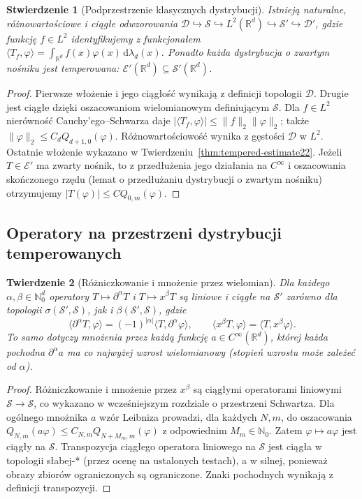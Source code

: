 \documentclass[11pt,a4paper]{article}
\numberwithin{equation}{section}
\theoremstyle{plain}
\newtheorem{twierdzenie}{Twierdzenie}[section]
\newtheorem{stwierdzenie}[twierdzenie]{Stwierdzenie}
\theoremstyle{definition}
\theoremstyle{remark}
\newcommand{\R}{\mathbb R}
\newcommand{\N}{\mathbb N}
\begin{document}
\begin{stwierdzenie}[Podprzestrzenie klasycznych dystrybucji]
\label{prop:schwartz-embeddings22}
Istnieją naturalne, różnowartościowe i ciągłe odwzorowania
$\mathcal D\hookrightarrow\mathcal S\hookrightarrow
L^2(\R^d)\hookrightarrow\mathcal S'\hookrightarrow\mathcal D'$,
gdzie funkcję $f\in L^2$ identyfikujemy z funkcjonałem
$\langle T_f,\varphi\rangle=\int_{\R^d}f(x)\varphi(x)
\,\mathrm d\lambda_d(x)$.
Ponadto każda dystrybucja o zwartym nośniku jest temperowana:
$\mathcal E'(\R^d)\subseteq\mathcal S'(\R^d)$.
\end{stwierdzenie}
\begin{proof}
Pierwsze włożenie i jego ciągłość wynikają z definicji
topologii $\mathcal D$. Drugie jest ciągłe dzięki
oszacowaniom wielomianowym definiującym $\mathcal S$.
Dla $f\in L^2$ nierówność Cauchy'ego--Schwarza daje
$|\langle T_f,\varphi\rangle|\le\|f\|_2\|\varphi\|_2$;
także $\|\varphi\|_2\le C_dQ_{d+1,0}(\varphi)$.
Różnowartościowość wynika z gęstości $\mathcal D$
w $L^2$. Ostatnie włożenie wykazano w
Twierdzeniu~\ref{thm:tempered-estimate22}.
Jeżeli $T\in\mathcal E'$ ma zwarty nośnik,
to z przedłużenia jego działania na $C^\infty$ i oszacowania
skończonego rzędu (lemat o przedłużaniu dystrybucji o zwartym nośniku)
otrzymujemy $|T(\varphi)|\le C Q_{0,m}(\varphi)$.
\end{proof}

\subsection{Operatory na przestrzeni dystrybucji temperowanych}

\begin{twierdzenie}[Różniczkowanie i mnożenie przez wielomian]
\label{thm:tempered-operators22}
Dla każdego $\alpha,\beta\in\N_0^d$ operatory
$T\mapsto\partial^\alpha T$ i $T\mapsto x^\beta T$
są liniowe i ciągłe na $\mathcal S'$ zarówno dla topologii
$\sigma(\mathcal S',\mathcal S)$, jak i
$\beta(\mathcal S',\mathcal S)$, gdzie
\[
\langle\partial^\alpha T,\varphi\rangle
=(-1)^{|\alpha|}\langle T,\partial^\alpha\varphi\rangle,
\qquad\langle x^\beta T,\varphi\rangle
=\langle T,x^\beta\varphi\rangle.
\]
To samo dotyczy mnożenia przez każdą funkcję
$a\in C^\infty(\R^d)$, której każda pochodna
$\partial^\alpha a$ ma co najwyżej wzrost wielomianowy
(stopień wzrostu może zależeć od $\alpha$).
\end{twierdzenie}
\begin{proof}
Różniczkowanie i mnożenie przez $x^\beta$ są ciągłymi
operatorami liniowymi $\mathcal S\to\mathcal S$,
co wykazano w wcześniejszym rozdziale o przestrzeni Schwartza.
Dla ogólnego mnożnika $a$ wzór Leibniza prowadzi,
dla każdych $N,m$, do oszacowania
$Q_{N,m}(a\varphi)\le C_{N,m}Q_{N+M_m,m}(\varphi)$
z odpowiednim $M_m\in\N_0$. Zatem
$\varphi\mapsto a\varphi$ jest ciągły na $\mathcal S$.
Transpozycja ciągłego operatora liniowego na $\mathcal S$
jest ciągła w topologii słabej-* (przez ocenę na
ustalonych testach), a w silnej, ponieważ obrazy
zbiorów ograniczonych są ograniczone.
Znaki pochodnych wynikają z definicji transpozycji.
\end{proof}
\end{document}
